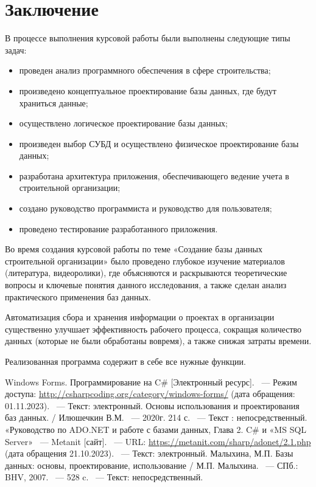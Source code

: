 \documentclass{../SIBGU-state}
\begin{document}
\section*{Заключение}
{}

В процессе выполнения курсовой работы были выполнены следующие типы задач: \par
\begin{itemize}
	\item проведен анализ программного обеспечения в сфере строительства;
	\item произведено концептуальное проектирование базы данных, где будут храниться данные;
    \item осуществлено логическое проектирование базы данных;
    \item произведен выбор СУБД и осуществлено физическое проектирование базы данных;
    \item разработана архитектура приложения, обеспечивающего ведение учета в строительной организации;
    \item создано руководство программиста и руководство для пользователя;
    \item проведено тестирование разработанного приложения.
\end{itemize}\par\bigskip
Во время создания курсовой работы по теме «Создание базы данных строительной организации» было проведено глубокое изучение материалов (литература, видеоролики), где объясняются и раскрываются теоретические вопросы и ключевые понятия данного исследования, а также сделан анализ практического применения баз данных. \par
Автоматизация сбора и хранения информации о проектах в организации существенно улучшает эффективность рабочего процесса, сокращая количество данных (которые не были обработаны вовремя), а также снижая затраты времени. \par
Реализованная программа содержит в себе все нужные функции. \par


\begin{thebibliography}{99\kern\bibindent}
	 Windows Forms. Программирование на C\# [Электронный ресурс]. ~--- Режим доступа: \url{http://csharpcoding.org/category/windows-forms/} (дата обращения: 01.11.2023). ~--- Текст: электронный.
	 Основы использования и проектирования баз данных. / Илюшечкин В.М. ~--- 2020г. 214 с. ~--- Текст : непосредственный. 
     «Руководство по ADO.NET и работе с базами данных, Глава 2. C\# и «MS SQL Server» ~--- Metanit [сайт]. ~--- URL: \url{ https://metanit.com/sharp/adonet/2.1.php} (дата обращения 21.10.2023). ~--- Текст: электронный. 
     Малыхина, М.П. Базы данных: основы, проектирование, использование / М.П. Малыхина. ~--- СПб.: BHV, 2007. ~--- 528 c. ~--- Текст: непосредственный. 
\end{thebibliography}
\end{document}
